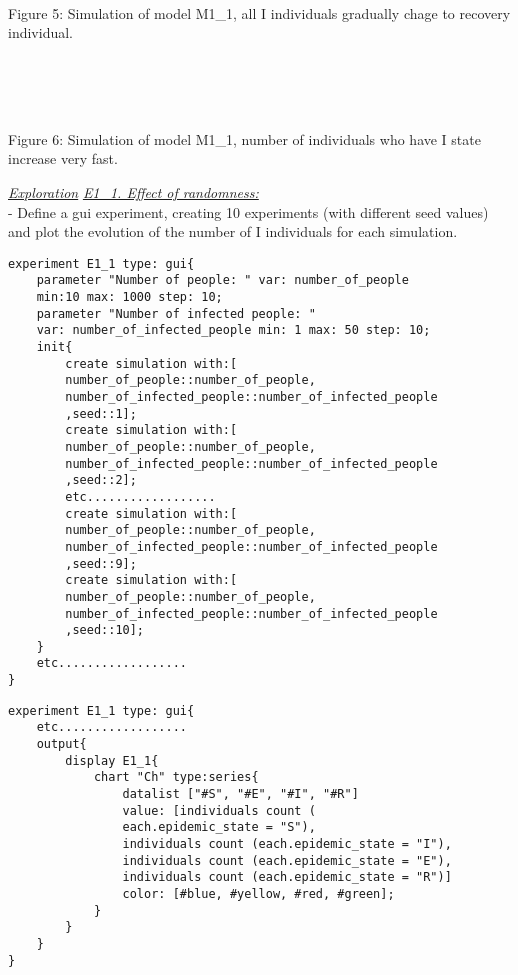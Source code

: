 \documentclass{article}
\begin{document}
\\\\
\begin{pic5}
\\
\caption{Figure 5: Simulation of model M1\_1, all I individuals gradually chage to recovery individual.}
\end{pic5}
\\\\
\begin{pic6}
\\
\caption{Figure 6: Simulation of model M1\_1, number of individuals who have I state increase very fast.}
\end{pic6}
\newpage
\underline{\emph{Exploration}}
\newline\newline
\underline{\textit{E1\_1. Effect of randomness:}}
\\
- Define a gui experiment, creating 10 experiments (with different seed values) and plot the evolution of the number of I individuals for each simulation.
\newline\newline
\begin{tcolorbox}
\begin{lstlisting}
experiment E1_1 type: gui{
	parameter "Number of people: " var: number_of_people 
	min:10 max: 1000 step: 10;
	parameter "Number of infected people: " 
	var: number_of_infected_people min: 1 max: 50 step: 10;
	init{
		create simulation with:[
		number_of_people::number_of_people,
		number_of_infected_people::number_of_infected_people
		,seed::1];
		create simulation with:[
		number_of_people::number_of_people,
		number_of_infected_people::number_of_infected_people
		,seed::2];
		etc..................
		create simulation with:[
		number_of_people::number_of_people,
		number_of_infected_people::number_of_infected_people
		,seed::9];
		create simulation with:[
		number_of_people::number_of_people,
		number_of_infected_people::number_of_infected_people
		,seed::10];
	}
	etc..................
}
\end{lstlisting}
\end{tcolorbox}
\newpage
\begin{tcolorbox}
\begin{lstlisting}
experiment E1_1 type: gui{
	etc..................
	output{
		display E1_1{
			chart "Ch" type:series{
				datalist ["#S", "#E", "#I", "#R"] 
				value: [individuals count (
				each.epidemic_state = "S"), 		
				individuals count (each.epidemic_state = "I"),			
				individuals count (each.epidemic_state = "E"), 				
				individuals count (each.epidemic_state = "R")] 
				color: [#blue, #yellow, #red, #green]; 			  
			}
		}
	}
}
\end{lstlisting}
\end{tcolorbox}
\end{document}
